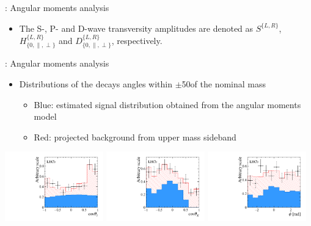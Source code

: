 \documentclass[aspectratio=1610]{beamer}
\begin{document}
\begin{frame}{\BdToKpimm: Angular moments analysis}
\begin{itemize}
\medskip
 
\item The S-, P- and D-wave transversity amplitudes are denoted as $S^{\{L,R\}}$, $H^{\{L,R\}}_{\{0,\parallel,\perp\}}$ and $D^{\{L,R\}}_{\{0,\parallel,\perp\}}$, respectively.
\end{itemize}
\end{frame}

\begin{frame}{\BdToKpimm: Angular moments analysis}
\begin{itemize}
  \item Distributions of the decays angles within $\pm$50\mevcc of the nominal \Bz mass
  \begin{itemize}
    \item Blue: estimated signal distribution obtained from the angular moments model
    \item Red: projected background from upper mass sideband
  \end{itemize}
\end{itemize}

\medskip

\centering
\includegraphics[width=0.32\textwidth]{figs/kpimm/angular-analysis/costhetal.pdf}
\includegraphics[width=0.32\textwidth]{figs/kpimm/angular-analysis/costhetak.pdf}
\includegraphics[width=0.32\textwidth]{figs/kpimm/angular-analysis/phi.pdf}
\end{frame}
\end{document}
